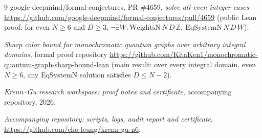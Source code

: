 \documentclass[11pt]{article}
\theoremstyle{definition}
\begin{document}
\begin{thebibliography}{9}
 google-deepmind/formal-conjectures, PR \#4659,
\emph{solve all-even integer cases}
\url{https://github.com/google-deepmind/formal-conjectures/pull/4659}
(public Lean proof: for even $N\ge 6$ and $D\ge 3$,
$\neg\exists W:\mathrm{WeightsN}\,N\,D\,\mathbb Z,\
\mathrm{EqSystemN}\,N\,D\,W$).

 \emph{Sharp color bound for monochromatic quantum
graphs over arbitrary integral domains}, formal proof repository
\url{https://github.com/KitaKen1/monochromatic-quantum-graph-sharp-bound-lean}
(main result: over every integral domain, even $N\ge 6$, any EqSystemN
solution satisfies $D\le N-2$).

 \emph{Krenn--Gu research workspace: proof notes and
certificate}, accompanying repository, 2026.

 \emph{Accompanying repository: scripts, logs, audit
report and certificate}, \url{https://github.com/cho-leung/krenn-gu-n6}.

\end{thebibliography}
\end{document}
